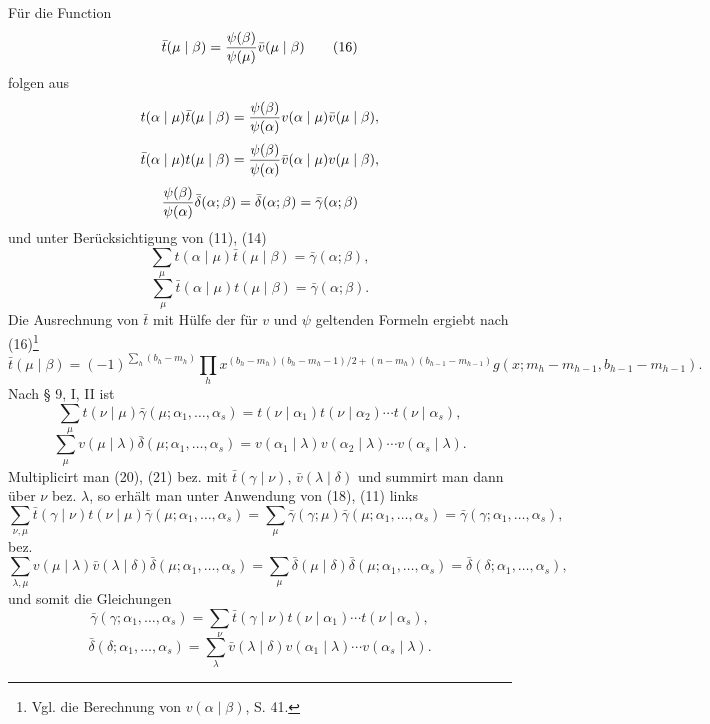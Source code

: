 Für die Function
\begin{equation}
 \bar t(\mu\mid\beta)={\psi(\beta)\over\psi(\mu)}\bar v(\mu\mid\beta)
\tag{16}
\end{equation}
folgen aus
\[
 t(\alpha\mid\mu)\bar t(\mu\mid\beta)
 ={\psi(\beta)\over\psi(\alpha)}v(\alpha\mid\mu)\bar v(\mu\mid\beta),
\]
\[
 \bar t(\alpha\mid\mu)t(\mu\mid\beta)
 ={\psi(\beta)\over\psi(\alpha)}\bar v(\alpha\mid\mu)v(\mu\mid\beta),
\]
\[
 {\psi(\beta)\over\psi(\alpha)}\bar\delta(\alpha;\beta)=\bar\delta(\alpha;\beta)=\bar\gamma(\alpha;\beta)
\]
und unter Berücksichtigung von (11), (14)
\begin{equation}
 \sum_\mu t(\alpha\mid\mu)\bar t(\mu\mid\beta)=\bar\gamma(\alpha;\beta),
\tag{17}
\end{equation}
\begin{equation}
 \sum_\mu\bar t(\alpha\mid\mu)t(\mu\mid\beta)=\bar\gamma(\alpha;\beta).
\tag{18}
\end{equation}
Die Ausrechnung von $\bar t$ mit Hülfe der für $v$ und $\psi$ geltenden Formeln ergiebt nach (16)\footnote{Vgl. die Berechnung von $v(\alpha\mid\beta)$, S. 41.}
\begin{equation}
 \bar t(\mu\mid\beta)=(-1)^{\sum_h(b_h-m_h)}
 \prod_h x^{(b_h-m_h)(b_h-m_h-1)/2+(n-m_h)(b_{h-1}-m_{h-1})}
 g(x;m_h-m_{h-1},b_{h-1}-m_{h-1}).
\tag{19}
\end{equation}
Nach § 9, I, II ist
\begin{equation}
 \sum_\mu t(\nu\mid\mu)\bar\gamma(\mu;\alpha_1,\ldots,\alpha_s)
 =t(\nu\mid\alpha_1)t(\nu\mid\alpha_2)\cdots t(\nu\mid\alpha_s),
\tag{20}
\end{equation}
\begin{equation}
 \sum_\mu v(\mu\mid\lambda)\bar\delta(\mu;\alpha_1,\ldots,\alpha_s)
 =v(\alpha_1\mid\lambda)v(\alpha_2\mid\lambda)\cdots v(\alpha_s\mid\lambda).
\tag{21}
\end{equation}
Multiplicirt man (20), (21) bez. mit $\bar t(\gamma\mid\nu)$, $\bar v(\lambda\mid\delta)$ und summirt man dann über $\nu$ bez. $\lambda$, so erhält man unter Anwendung von (18), (11) links
\[
 \sum_{\nu,\mu}\bar t(\gamma\mid\nu)t(\nu\mid\mu)\bar\gamma(\mu;\alpha_1,\ldots,\alpha_s)
 =\sum_\mu\bar\gamma(\gamma;\mu)\bar\gamma(\mu;\alpha_1,\ldots,\alpha_s)
 =\bar\gamma(\gamma;\alpha_1,\ldots,\alpha_s),
\]
bez.
\[
 \sum_{\lambda,\mu}v(\mu\mid\lambda)\bar v(\lambda\mid\delta)\bar\delta(\mu;\alpha_1,\ldots,\alpha_s)
 =\sum_\mu\bar\delta(\mu\mid\delta)\bar\delta(\mu;\alpha_1,\ldots,\alpha_s)
 =\bar\delta(\delta;\alpha_1,\ldots,\alpha_s),
\]
und somit die Gleichungen
\begin{equation}
 \bar\gamma(\gamma;\alpha_1,
\ldots,\alpha_s)=\sum_\nu \bar t(\gamma\mid\nu)t(\nu\mid\alpha_1)\cdots t(\nu\mid\alpha_s),
\tag{22}
\end{equation}
\begin{equation}
 \bar\delta(\delta;\alpha_1,
\ldots,\alpha_s)=\sum_\lambda \bar v(\lambda\mid\delta)v(\alpha_1\mid\lambda)\cdots v(\alpha_s\mid\lambda).
\tag{23}
\end{equation}

